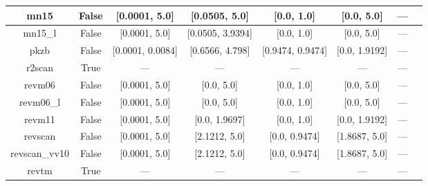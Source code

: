 \begin{tabular}{|c|c|c|c|c|c|c|l|}
          mn15 &                 False &     [0.0001, 5.0] &     [0.0505, 5.0] &        [0.0, 1.0] &     [0.0, 5.0] &        --- &                                                                  \cite{Yu2016_5032} \\ \hline
       mn15\_l &                 False &     [0.0001, 5.0] &  [0.0505, 3.9394] &        [0.0, 1.0] &     [0.0, 5.0] &        --- &                                                                  \cite{Yu2016_1280} \\ \hline
          pkzb &                 False &  [0.0001, 0.0084] &   [0.6566, 4.798] &  [0.9474, 0.9474] &  [0.0, 1.9192] &        --- &                                                              \cite{Perdew1999_2544} \\ \hline
        r2scan &                  True &               --- &               --- &               --- &            --- &        --- &                                            \cite{Furness2020_8208,Furness2020_9248} \\ \hline
        revm06 &                 False &     [0.0001, 5.0] &        [0.0, 5.0] &        [0.0, 1.0] &     [0.0, 5.0] &        --- &                                                               \cite{Wang2018_10257} \\ \hline
     revm06\_l &                 False &     [0.0001, 5.0] &        [0.0, 5.0] &        [0.0, 1.0] &     [0.0, 5.0] &        --- &                                                                \cite{Wang2017_8487} \\ \hline
        revm11 &                 False &     [0.0001, 5.0] &     [0.0, 1.9697] &        [0.0, 1.0] &  [0.0, 1.9192] &        --- &                                                               \cite{Verma2019_2966} \\ \hline
       revscan &                 False &     [0.0001, 5.0] &     [2.1212, 5.0] &     [0.0, 0.9474] &  [1.8687, 5.0] &        --- &                                                               \cite{Mezei2018_2469} \\ \hline
 revscan\_vv10 &                 False &     [0.0001, 5.0] &     [2.1212, 5.0] &     [0.0, 0.9474] &  [1.8687, 5.0] &        --- &                                                               \cite{Mezei2018_2469} \\ \hline
         revtm &                  True &               --- &               --- &               --- &            --- &        --- &                                                                \cite{Jana2019_6356} \\ \hline

\end{tabular}
